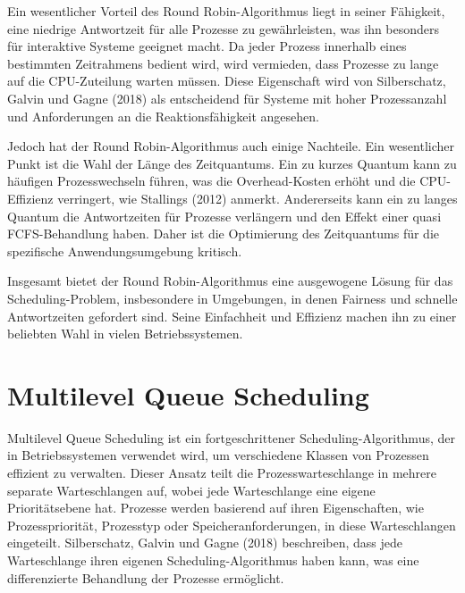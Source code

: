 Ein wesentlicher Vorteil des Round Robin-Algorithmus liegt in seiner Fähigkeit, eine niedrige Antwortzeit für alle Prozesse zu gewährleisten, was ihn besonders für interaktive Systeme geeignet macht. Da jeder Prozess innerhalb eines bestimmten Zeitrahmens bedient wird, wird vermieden, dass Prozesse zu lange auf die CPU-Zuteilung warten müssen. Diese Eigenschaft wird von Silberschatz, Galvin und Gagne (2018) als entscheidend für Systeme mit hoher Prozessanzahl und Anforderungen an die Reaktionsfähigkeit angesehen.

Jedoch hat der Round Robin-Algorithmus auch einige Nachteile. Ein wesentlicher Punkt ist die Wahl der Länge des Zeitquantums. Ein zu kurzes Quantum kann zu häufigen Prozesswechseln führen, was die Overhead-Kosten erhöht und die CPU-Effizienz verringert, wie Stallings (2012) anmerkt. Andererseits kann ein zu langes Quantum die Antwortzeiten für Prozesse verlängern und den Effekt einer quasi FCFS-Behandlung haben. Daher ist die Optimierung des Zeitquantums für die spezifische Anwendungsumgebung kritisch.

Insgesamt bietet der Round Robin-Algorithmus eine ausgewogene Lösung für das Scheduling-Problem, insbesondere in Umgebungen, in denen Fairness und schnelle Antwortzeiten gefordert sind. Seine Einfachheit und Effizienz machen ihn zu einer beliebten Wahl in vielen Betriebssystemen.



\section{Multilevel Queue Scheduling}

Multilevel Queue Scheduling ist ein fortgeschrittener Scheduling-Algorithmus, der in Betriebssystemen verwendet wird, um verschiedene Klassen von Prozessen effizient zu verwalten. Dieser Ansatz teilt die Prozesswarteschlange in mehrere separate Warteschlangen auf, wobei jede Warteschlange eine eigene Prioritätsebene hat. Prozesse werden basierend auf ihren Eigenschaften, wie Prozesspriorität, Prozesstyp oder Speicheranforderungen, in diese Warteschlangen eingeteilt. Silberschatz, Galvin und Gagne (2018) beschreiben, dass jede Warteschlange ihren eigenen Scheduling-Algorithmus haben kann, was eine differenzierte Behandlung der Prozesse ermöglicht.

